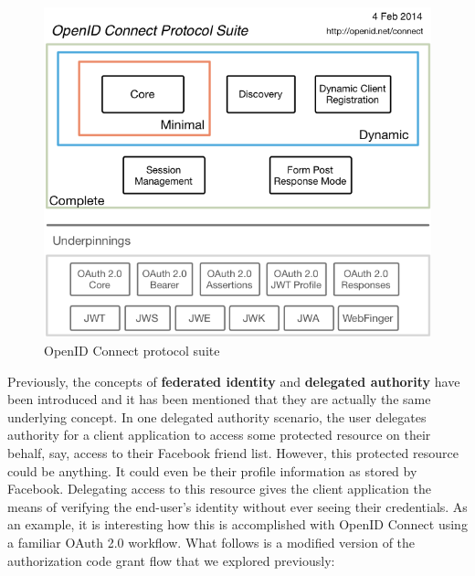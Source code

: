 \begin{figure}
    \centering
    \includegraphics[scale=2.0]{chapters/images/chp3/OpenIDC-map.png}
    \caption{OpenID Connect protocol suite}
    \label{fig:oidc}
\end{figure}

Previously, the concepts of \textbf{federated identity} and \textbf{delegated authority} have been introduced and it has been mentioned that they are actually the same underlying concept. In one delegated authority scenario, the user delegates authority for a client application to access some protected resource on their behalf, say, access to their Facebook friend list. However, this protected resource could be anything. It could even be their profile information as stored by Facebook. Delegating access to this resource gives the client application the means of verifying the end-user's identity without ever seeing their credentials. As an example, it is interesting how this is accomplished with OpenID Connect using a familiar OAuth 2.0 workflow. What follows is a modified version of the authorization code grant flow that we explored previously:

